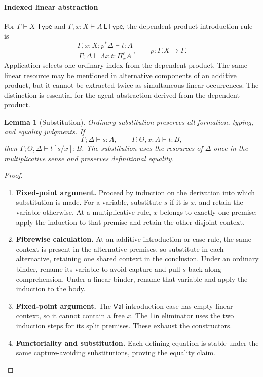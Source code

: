\documentclass[11pt,a4paper]{article}
\numberwithin{equation}{section}
\newtheorem{lemma}[theorem]{Lemma}
\theoremstyle{definition}
\theoremstyle{remark}
\theoremstyle{plain}
\providecommand{\Lin}{\mathsf{Lin}}
\providecommand{\Val}{\mathsf{Val}}
\providecommand{\ordturn}{\vdash}
\providecommand{\linturn}{\vdash}
\providecommand{\ltype}{\mathsf{LType}}
\providecommand{\type}{\mathsf{Type}}
\begin{document}
\paragraph{Indexed linear abstraction}

For $\Gamma\ordturn X\ \type$ and
$\Gamma,x:X\vdash A\ \ltype$, the dependent product introduction rule is
\[
 \frac{\Gamma,x:X;p^*\Delta\linturn t:A}
      {\Gamma;\Delta\linturn\Lambda x.t:\Pi_x^\ell A},
 \qquad p:\Gamma.X\to\Gamma.
\]
Application selects one ordinary index from the dependent
product. The same linear resource may be mentioned in alternative
components of an additive product, but it cannot be extracted twice
as simultaneous linear occurrences. The distinction is essential for
the agent abstraction derived from the dependent product.

\begin{lemma}[Substitution]
\label{agt-lem-substitution}
Ordinary substitution preserves all formation, typing, and equality
judgments. If
\[
 \Gamma;\Delta\linturn s:A,
 \qquad \Gamma;\Theta,x:A\linturn t:B,
\]
then
$\Gamma;\Theta,\Delta\linturn t[s/x]:B$.
The substitution uses the resources of $\Delta$ once in the multiplicative
sense and preserves definitional equality.
\end{lemma}
\begin{proof}
\leavevmode
\begin{enumerate}[label=\textup{(\arabic*)},leftmargin=*,itemsep=4pt,topsep=3pt]
  \item \textbf{Fixed-point argument.} Proceed by induction on the derivation into which substitution is made. For a variable, substitute $s$ if it is $x$, and retain the variable otherwise. At a multiplicative rule, $x$ belongs to exactly one premise; apply the
induction to that premise and retain the other disjoint context.
  \item \textbf{Fibrewise calculation.} At an
additive introduction or case rule, the same context is present in the
alternative premises, so substitute in each alternative, retaining one
shared context in the conclusion. Under an ordinary binder, rename its
variable to avoid capture and pull $s$ back along comprehension. Under a
linear binder, rename that variable and apply the induction to the body.
  \item \textbf{Fixed-point argument.} The $\Val$ introduction case has empty linear context, so it cannot contain
a free $x$. The $\Lin$ eliminator uses the two induction steps for its split
premises. These exhaust the constructors.
  \item \textbf{Functoriality and substitution.} Each defining equation is stable
under the same capture-avoiding substitutions, proving the equality claim.
\end{enumerate}
\end{proof}
\end{document}
